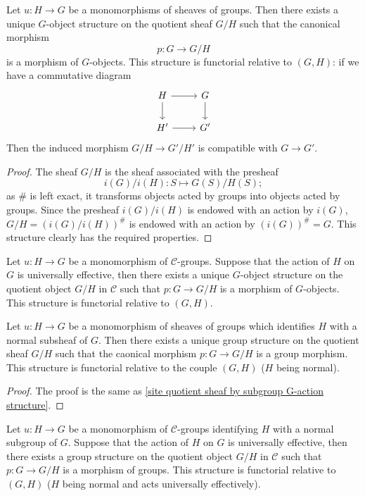 \begin{proposition}\label{site quotient sheaf by subgroup G-action structure}
Let $u:H\to G$ be a monomorphisms of sheaves of groups. Then there exists a unique $G$-object structure on the quotient sheaf $G/H$ such that the canonical morphism
\[p:G\to G/H\]
is a morphism of $G$-objects. This structure is functorial relative to $(G,H)$: if we have a commutative diagram
\[\begin{tikzcd}
H\ar[r]\ar[d]&G\ar[d]\\
H'\ar[r]&G'
\end{tikzcd}\]
Then the induced morphism $G/H\to G'/H'$ is compatible with $G\to G'$.
\end{proposition}
\begin{proof}
The sheaf $G/H$ is the sheaf associated with the presheaf
\[i(G)/i(H):S\mapsto G(S)/H(S);\]
as $\#$ is left exact, it transforms objects acted by groups into objects acted by groups. Since the presheaf $i(G)/i(H)$ is endowed with an action by $i(G)$, $G/H=(i(G)/i(H))^\#$ is endowed with an action by $(i(G))^\#=G$. This structure clearly has the required properties.
\end{proof}

\begin{corollary}\label{site quotient by universally effective subgroup G-action structure}
Let $u:H\to G$ be a monomorphism of $\mathcal{C}$-groups. Suppose that the action of $H$ on $G$ is universally effective, then there exists a unique $G$-object structure on the quotient object $G/H$ in $\mathcal{C}$ such that $p:G\to G/H$ is a morphism of $G$-objects. This structure is functorial relative to $(G,H)$.
\end{corollary}

\begin{proposition}\label{site quotient sheaf by normal subgroup group structure}
Let $u:H\to G$ be a monomorphism of sheaves of groups which identifies $H$ with a normal subsheaf of $G$. Then there exists a unique group structure on the quotient sheaf $G/H$ such that the caonical morphism $p:G\to G/H$ is a group morphism. This structure is functorial relative to the couple $(G,H)$ ($H$ being normal).
\end{proposition}
\begin{proof}
The proof is the same as \cref{site quotient sheaf by subgroup G-action structure}.
\end{proof}

\begin{corollary}\label{site quotient by universally effective normal subgroup group structure}
Let $u:H\to G$ be a monomorphism of $\mathcal{C}$-groups identifying $H$ with a normal subgroup of $G$. Suppose that the action of $H$ on $G$ is universally effective, then there exists a group structure on the quotient object $G/H$ in $\mathcal{C}$ such that $p:G\to G/H$ is a morphism of groups. This structure is functorial relative to $(G,H)$ ($H$ being normal and acts universally effectively).
\end{corollary}

